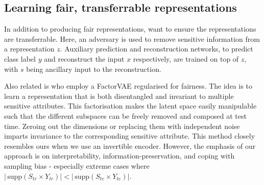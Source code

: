 \subsection{Learning fair, transferrable representations}
In addition to producing fair representations, \citet{madras2018learning} want to ensure the representations are transferrable.
Here, an adversary is used to remove sensitive information from a representation $z$.
Auxiliary prediction and reconstruction networks, to predict class label $y$
and reconstruct the input $x$ respectively,
are trained on top of $z$, with $s$ being ancillary input to the reconstruction.

Also related is \citet{creager2019flexibly} who employ a FactorVAE \citep{kim2018disentangling} regularised for fairness.
The idea is to learn a representation that is both disentangled and invariant to multiple sensitive attributes.
This factorisation makes the latent space easily manipulable such that the different subspaces can be freely removed and composed at test time.
Zeroing out the dimensions or replacing them with independent noise imparts invariance to the corresponding sensitive attribute.
This method closely resembles ours when we use an invertible encoder.
However, the emphasis of our approach is on interpretability, information-preservation, and coping with sampling bias - especially extreme cases where $|\, \textrm{supp}(S_{tr} \times Y_{tr}) | < |\, \textrm{supp}(S_{te} \times Y_{te}) |$.

